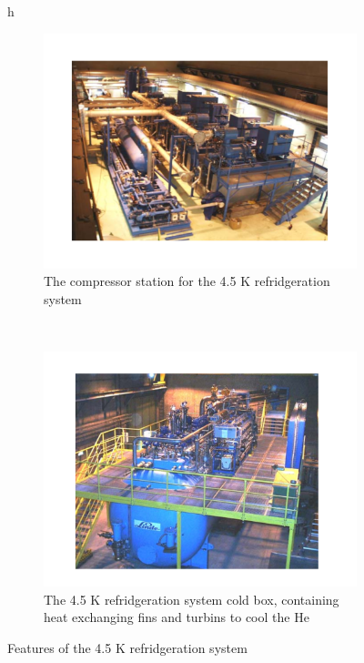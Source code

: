 \begin{figure}{h}
    \centering
    \begin{subfigure}[h]{0.450\textwidth}
        \includegraphics[width=\textwidth]{Figures/LHC_Diagrams/LHC_Cryogen_4p5KFridgeCompressor.pdf}
        \caption{The compressor station for the 4.5 K refridgeration system}\label{fig:lhc_cryo_4p5_compressor}
      \end{subfigure}
      ~ %
    \begin{subfigure}[h]{0.450\textwidth}
        \includegraphics[width=\textwidth]{Figures/LHC_Diagrams/LHC_Cryogen4p5KFridge_Coldbox.pdf}
        \caption{The 4.5 K refridgeration system cold box, containing
          heat exchanging fins and turbins to cool the He}\label{fig:lhc_cryo_4p5_coldbox}
      \end{subfigure}
      \caption{Features of the 4.5 K refridgeration system}\label{fig:lhc_cryo_4p5}
\end{figure}

